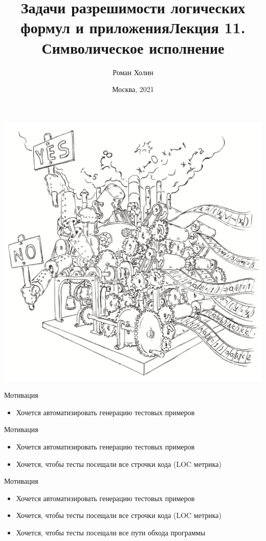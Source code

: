 \documentclass{beamer}
\begin{document}
\title{Задачи разрешимости логических формул и приложения\newline Лекция 11. Символическое исполнение}
\author{Роман Холин}
\date{Москва, 2021}

\begin{frame}
\includegraphics[scale=0.5]{../decision-procedure.png}
\end{frame}

\frame{\titlepage}

\begin{frame}{Мотивация}
\begin{itemize}
\item Хочется автоматизировать генерацию тестовых примеров
\end{itemize}
\end{frame}

\begin{frame}{Мотивация}
\begin{itemize}
\item Хочется автоматизировать генерацию тестовых примеров
\item Хочется, чтобы тесты посещали все строчки кода (LOC метрика)
\end{itemize}
\end{frame}

\begin{frame}{Мотивация}
\begin{itemize}
\item Хочется автоматизировать генерацию тестовых примеров
\item Хочется, чтобы тесты посещали все строчки кода (LOC метрика)
\item Хочется, чтобы тесты посещали все пути обхода программы
\end{itemize}
\end{frame}
\end{document}
